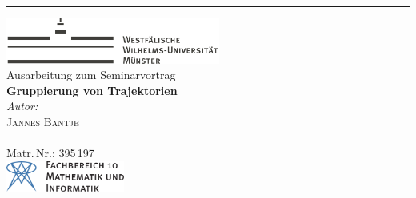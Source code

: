 \begin{titlepage}
\hspace*{0.12\textwidth}%
\rule{2pt}{\textheight}%
\hspace*{0.05\textwidth}%
\begin{minipage}[b]{0.80\textwidth}
	\raggedright
	\includegraphics[height=1.5cm, keepaspectratio]{Bilder/Logo_WWU_Muenster.pdf} \\[2cm]
	{\Large \sffamily Ausarbeitung zum Seminarvortrag}\\[0.5cm]
	{\Huge\sffamily\bfseries Gruppierung von Trajektorien}\\[7cm]
	{\large \textit{Autor:}}\\[5pt]
	{\Large \textsc{Jannes Bantje}}\\[5pt] %
	{\small{}\\ Matr.\,Nr.: 395\,197}\\[2.5cm]
	
	\vspace{0.1\textheight}
	\includegraphics[height=1cm, keepaspectratio]{Bilder/fb10logo.pdf}
\end{minipage}	



\end{titlepage}
